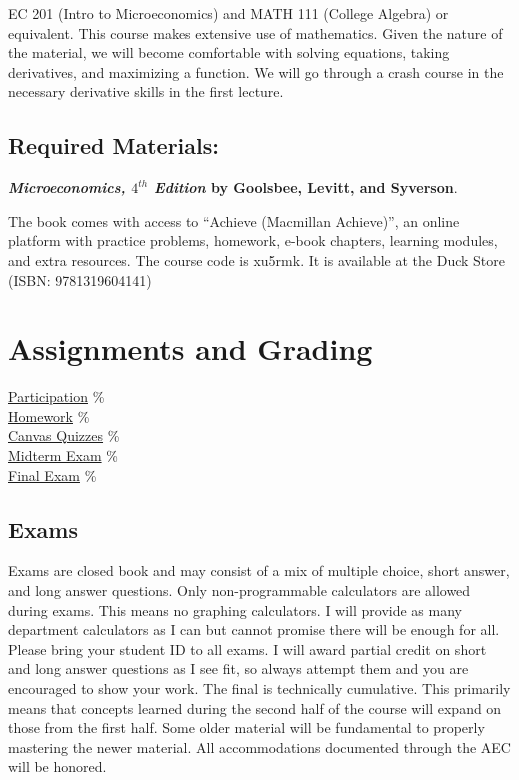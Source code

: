 EC 201 (Intro to Microeconomics) and MATH 111 (College Algebra) or equivalent.
This course makes extensive use of mathematics.
Given the nature of the material, we will become comfortable with solving equations, taking derivatives, and maximizing a function.
We will go through a crash course in the necessary derivative skills in the first lecture.

\subsection*{Required Materials:}

\textbf{\textit{Microeconomics, $4^{th}$ Edition} by Goolsbee, Levitt, and Syverson}.

The book comes with access to “Achieve (Macmillan Achieve)”, an online platform with practice problems, homework, e-book chapters, learning modules, and extra resources.
The course code is xu5rmk.
It is available at the Duck Store (ISBN: 9781319604141)

\section{Assignments and Grading} 

\begin{center}\begin{minipage}{3.8in}\begin{flushleft}
    \hyperlink{grading_participation}{Participation} \% \\
    \hyperlink{grading_HW}{Homework}         \% \\
    \hyperlink{grading_quiz}{Canvas Quizzes} \% \\
    \hyperlink{grading_exam}{Midterm Exam}   \% \\
    \hyperlink{grading_exam}{Final Exam}     \% \\
\end{flushleft}\end{minipage}\end{center}

\hypertarget{grading_exam}{\subsection{Exams}}
Exams are closed book and may consist of a mix of multiple choice, short answer, and long answer questions.
Only non-programmable calculators are allowed during exams.
This means no graphing calculators.
I will provide as many department calculators as I can but cannot promise there will be enough for all.
Please bring your student ID to all exams.
I will award partial credit on short and long answer questions as I see fit, so always attempt them and you are encouraged to show your work.
The final is technically cumulative.
This primarily means that concepts learned during the second half of the course will expand on those from the first half.
Some older material will be fundamental to properly mastering the newer material.
All accommodations documented through the AEC will be honored.

